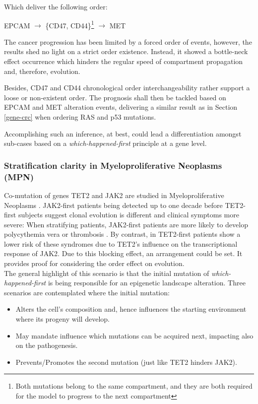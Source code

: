Which deliver the following order: 
\begin{center}
EPCAM $\rightarrow$ \{CD47, CD44\}\footnote{Both mutations belong to the same compartment, and they are both required for the model to progress to the next compartment} $\rightarrow$ MET
\end{center}


The cancer progression has been limited by a forced order of events, however, the results shed no light on a strict order existence. Instead, it showed
a bottle-neck effect occurrence which hinders the regular speed of compartment propagation and, therefore, evolution. 

Besides, CD47 and CD44 chronological order interchangeability rather support a loose or non-existent order. The prognosis shall then be tackled based on EPCAM and MET alteration events, delivering a similar result as in Section \ref{gene-crc} when ordering RAS and p53 mutations. 

Accomplishing such an inference, at best, could lead a differentiation amongst sub-cases based on a \textit{which-happened-first} principle at a gene level.

\subsubsection{Stratification clarity in Myeloproliferative Neoplasms (MPN)}
\label{gene-mpn}
Co-mutation of genes TET2 and JAK2 are studied in Myeloproliferative Neoplasms \cite{Ortmann2015EffectNeoplasms}. JAK2-first patients being detected up to one decade before TET2-first subjects suggest clonal evolution is different and clinical symptoms more severe: When stratifying patients, JAK2-first patients are more likely to develop polycythemia vera or thrombosis \cite{Levine2007JAK-2Disease}. By contrast, in TET2-first patients show a lower risk of these syndromes due to TET2's influence on the transcriptional response of JAK2. Due to this blocking effect, an arrangement could be set. It provides proof for considering the order effect on evolution.
\\

The general highlight of this scenario is that the initial mutation of \textit{which-happened-first} is being responsible for an epigenetic landscape alteration. Three scenarios are contemplated where the initial mutation:

\begin{itemize}
    \item Alters the cell's composition and, hence influences the starting environment where its progeny will develop.
    \item May mandate influence which mutations can be acquired next, impacting also on the pathogenesis.
    \item Prevents/Promotes the second mutation (just like TET2 hinders JAK2).
\end{itemize}

